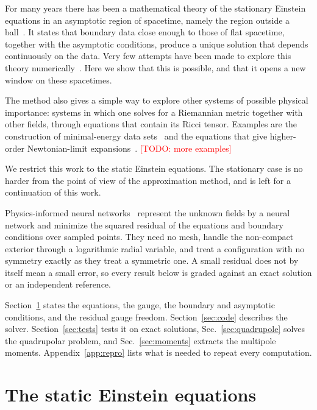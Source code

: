 \documentclass[aps,prd,twocolumn,superscriptaddress, nofootinbib,floatfix]{revtex4-2}
\newcommand{\todo}[1]{\textcolor{red}{[TODO: #1]}}
\begin{document}
For many years there has been a mathematical theory of the stationary Einstein equations in an asymptotic region of spacetime, namely the region outside a ball~\cite{Reula1989}.
It states that boundary data close enough to those of flat spacetime, together with the asymptotic conditions, produce a unique solution that depends continuously on the data.
Very few attempts have been made to explore this theory numerically~\cite{TODO_numerics_stationary}.
Here we show that this is possible, and that it opens a new window on these spacetimes.

The method also gives a simple way to explore other systems of possible physical importance: systems in which one solves for a Riemannian metric together with other fields, through equations that contain its Ricci tensor.
Examples are the construction of minimal-energy data sets~\cite{TODO_minimal_energy} and the equations that give higher-order Newtonian-limit expansions~\cite{TODO_newtonian_limit}.
\todo{more examples}

We restrict this work to the static Einstein equations.
The stationary case is no harder from the point of view of the approximation method, and is left for a continuation of this work.

Physics-informed neural networks~\cite{Raissi2019} represent the unknown fields by a neural network and minimize the squared residual of the equations and boundary conditions over sampled points.
They need no mesh, handle the non-compact exterior through a logarithmic radial variable, and treat a configuration with no symmetry exactly as they treat a symmetric one.
A small residual does not by itself mean a small error, so every result below is graded against an exact solution or an independent reference.

Section~\ref{sec:equations} states the equations, the gauge, the boundary and asymptotic conditions, and the residual gauge freedom.
Section~\ref{sec:code} describes the solver.
Section~\ref{sec:tests} tests it on exact solutions, Sec.~\ref{sec:quadrupole} solves the quadrupolar problem, and Sec.~\ref{sec:moments} extracts the multipole moments.
Appendix~\ref{app:repro} lists what is needed to repeat every computation.

\section{The static Einstein equations}\label{sec:equations}
\end{document}
